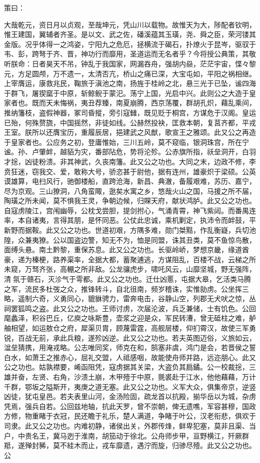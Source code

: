\documentclass[]{article}
\begin{document}
策曰：

大哉乾元，资日月以贞观，至哉坤元，凭山川以载物。故惟天为大，陟配者钦明，惟王建国，翼辅者齐圣。是以文、武之佐，磻溪蕴其玉璜，尧、舜之臣，荣河镂其金版。况乎体得一之鸿姿，宁阳九之危厄，拯横流于碣石，扑燎火于昆岑，驱驭于韦、彭，跨弩于齐、晋，神功行而靡用，圣道运而无名者乎？今将授公典策，其敬听朕命：日者昊天不吊，钟乱于我国家，网漏吞舟，强胡内赑，茫茫宇宙，惵々黎元，方足圆颅，万不遗一，太清否亢，桥山之痛已深，大宝屯如，平阳之祸相继。上宰膺运，康救兆民，鞠旅于滇池之南，扬旌于桂岭之北，悬三光于已坠，谧四海于群飞，屠猰窳于中原，斩鲸鲵于蒙汜。荡宁上国，光启中兴。此则公之大造于皇家者也。既而天未悔祸，夷丑荐臻，南夏崩腾，西京荡覆，群胡孔炽，藉乱乘间，推纳籓枝，盗假神器，冢司昏摐，旁引寇雠，既见贬于桐宫，方谋危于汉阁。皇运已殆，何殊赘旒，中国摇然，非徒如线。公赫然投袂，匡救本朝，复莒齐都，平戎王室。朕所以还膺宝历，重履辰居，挹建武之风猷，歌宣王之雅颂。此又公之再造于皇家者也。公应务之初，登庸惟始，三川五岭，莫不窥临，银洞珠宫，所在宁谧。孙、卢肇衅，越貊为灾，番部阽危，势将沦殄。公赤旗所指，祅垒洞开，白羽才捴，凶徒粉溃。非其神武，久丧南籓。此又公之功也。大同之末，边政不修，李贲狂迷，窃我交、爱，敢称大号，骄恣甚于尉他，据有连州，雄豪炽于梁硕。公英谟雄算，电扫风行，驰御楼船，直跨沧海，新昌、典澈，备履艰难，苏历、嘉宁，尽为京观。三山獠洞，八角蛮陬，逖矣水寓之乡，悠哉火山之国，马援之所不届，陶璜之所未闻，莫不惧我王灵，争朝边候，归賝天府，献状鸿胪。此又公之功也。自寇虏陵江，宫闱幽辱，公枕戈尝胆，提剑拊心，气涌青霄，神飞紫闼。而番禺连率，本自诸夷，言得其朋，是怀同恶。公仗此忠诚，乘机剿定，执沛令而衅鼓，平新野而据鞍。此又公之功也。世道初艰，方隅多难，勋门桀黠，作乱衡嶷，兵切池隍，众兼夷獠。公以国盗边警，知无不为，恤是同盟，诛其丑类，莫不鱼惊鸟散，面缚头悬。南土黔黎，重保苏息。此又公之功也。长驱岭峤，梦想京畿，缘道酋豪，递为榛梗，路养渠率，全据大都，蓄聚逋逃，方谋阻乱，百楼不战，云梯之所未窥，万驽齐张，高輣之所非敌。公龙骧虎步，啸吒风云，山靡坚城，野无强阵，清氛于赣石，灭沴气于雩都。此又公之功也。迁仕凶慝，屯据大皋，乞活类马腾之军，流民多杜弢之众，推锋转斗，自北徂南，频岁稽诛，实惟勍虏。公坐挥三略，遥制六奇，义勇同心，貔貅骋力，雷奔电击，谷静山空，列郡无犬吠之惊，丛祠罢狐鸣之盗。此又公之功也。王师讨虏，次届沦波，兵乏兼储，士有饥色。公回麾蠡泽，积谷巴丘，亿庾之咏斯豊，壶浆之迎是众，军民转漕，曾无砥柱之难，舻舳相望，如运敖仓之府，犀渠贝胄，顾蔑雷霆，高舰层楼，仰扪霄汉，故使三军勇锐，百战无前，承此兵粮，遂殄凶逆。此又公之功也。若夫英图迈俗，义旅如云，湓垒猜携，用淹戎略。公志唯同奖，师克在和，鹄塞非虞，鸿门是会，若晋侯之誓白水，如萧王之推赤心，屈礼交盟，人祗感咽，故能使舟师并路，远迩朋心。此又公之功也。姑孰襟要，崤函阻凭，寇虏据其关梁，大盗负其扃鐍。公一校裁捴，三雄并奋，左贤、右角，沙溃土崩，木甲殪于中原，氈裘赴于江水，他他藉藉，万计千群，鄂坂之隘斯开，夷庚之道无塞。此又公之功也。义军大众，俱集帝京，逆竖凶徒，犹屯皇邑。若夫表里山河，金汤险固，疏龙首以抗殿，揃华岳以为城，杂虏凭焉，强兵自若。公回兹地轴，抗此天罗，曾不崇朝，俾无遗噍，军容甚穆，国政方修，物重睹于衣冠，民还瞻于礼乐，楚人满道，争睹于叶公，汉老衔悲，俱欢于司隶。此又公之功也。内难初静，诸侯出关，外郡传烽，鲜卑犯塞，莫非且渠、当户，中贵名王，冀马迾于淮南，胡笳动于徐北。公舟师步甲，亘野横江，歼厥群羝，遂殚封豨，莫不絓木而止，戎车靡遗，遇泞而旋，归骖尽殪。此又公之功也。公
\end{document}
